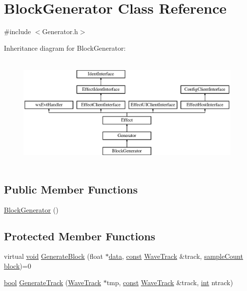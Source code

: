 \hypertarget{class_block_generator}{}\section{Block\+Generator Class Reference}
\label{class_block_generator}


{\ttfamily \#include $<$Generator.\+h$>$}

Inheritance diagram for Block\+Generator\+:\begin{figure}[H]
\begin{center}
\leavevmode
\includegraphics[height=5.753425cm]{class_block_generator}
\end{center}
\end{figure}
\subsection*{Public Member Functions}
\begin{DoxyCompactItemize}
\item 
\hyperlink{class_block_generator_ab65c93a76c6f78c6562518d96cef68de}{Block\+Generator} ()
\end{DoxyCompactItemize}
\subsection*{Protected Member Functions}
\begin{DoxyCompactItemize}
\item 
virtual \hyperlink{sound_8c_ae35f5844602719cf66324f4de2a658b3}{void} \hyperlink{class_block_generator_a8f841767662329ef31e4b1a2db9d530f}{Generate\+Block} (float $\ast$\hyperlink{lib_2expat_8h_ac39e72a1de1cb50dbdc54b08d0432a24}{data}, \hyperlink{getopt1_8c_a2c212835823e3c54a8ab6d95c652660e}{const} \hyperlink{class_wave_track}{Wave\+Track} \&track, \hyperlink{include_2audacity_2_types_8h_afa427e1f521ea5ec12d054e8bd4d0f71}{sample\+Count} \hyperlink{structblock}{block})=0
\item 
\hyperlink{mac_2config_2i386_2lib-src_2libsoxr_2soxr-config_8h_abb452686968e48b67397da5f97445f5b}{bool} \hyperlink{class_block_generator_a7d10f04fc0debc2d3d5fb3c41b46b986}{Generate\+Track} (\hyperlink{class_wave_track}{Wave\+Track} $\ast$tmp, \hyperlink{getopt1_8c_a2c212835823e3c54a8ab6d95c652660e}{const} \hyperlink{class_wave_track}{Wave\+Track} \&track, \hyperlink{xmltok_8h_a5a0d4a5641ce434f1d23533f2b2e6653}{int} ntrack)
\end{DoxyCompactItemize}
